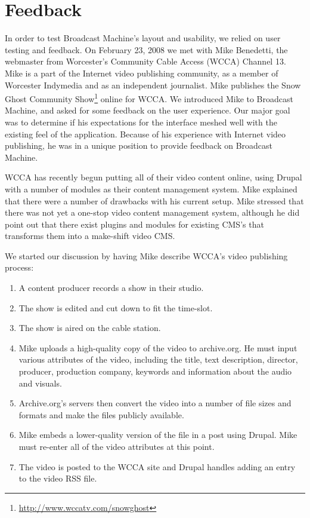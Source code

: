 \documentclass[a4paper,12pt]{report}
\begin{document}
\section{Feedback}

In order to test Broadcast Machine's layout and usability, we relied on user testing and feedback. On February 23, 2008 we met with Mike Benedetti, the webmaster from Worcester's Community Cable Access (WCCA) Channel 
13. Mike is a part of the Internet video publishing community, as a member of Worcester Indymedia and as an independent journalist. Mike 
publishes the Snow Ghost Community Show\footnote{\url{http://www.wccatv.com/snowghost}} online for WCCA.
We introduced Mike to Broadcast Machine, and asked for some feedback on the user experience.
Our major goal was to determine if his expectations for the interface meshed well with the existing feel of the application.
Because of his experience with Internet video publishing, he was in a unique position to provide feedback on Broadcast Machine.

WCCA has recently begun putting all of their video content online, using Drupal with a number of modules as their content management system. 
Mike explained that there were a number of drawbacks with his current setup. 
Mike stressed that there was not yet a one-stop video content management system, although he did point out that there 
exist plugins and modules for existing CMS's that transforms them into a make-shift video CMS. 

We started our discussion by having Mike describe WCCA's video publishing process:

\begin{enumerate}
\item A content producer records a show in their studio. 
\item The show is edited and cut down to fit the time-slot.
\item The show is aired on the cable station. 
\item Mike uploads a high-quality copy of the video to archive.org. He must input various attributes of the video, including the title, text description, director, producer, production company, keywords and information about the audio and visuals. 
\item Archive.org's servers then convert the video into a number of file sizes and formats and make the files publicly available.
\item Mike embeds a lower-quality version of the file in a post using Drupal. Mike must re-enter all of the video attributes at this point.
\item The video is posted to the WCCA site and Drupal handles adding an entry to the video RSS file.
\end{enumerate}
\end{document}
